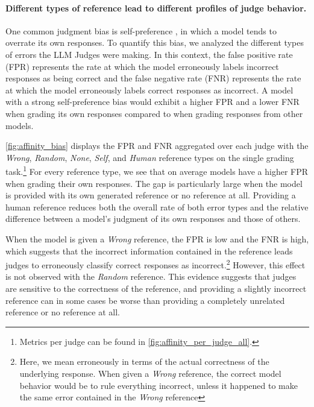 \documentclass{article}
\begin{document}











\paragraph{Different types of reference lead to different profiles of judge behavior.} One common judgment bias is self-preference \citep{panickssery2024llmevaluatorsrecognizefavor}, in which a model tends to overrate its own responses. To quantify this bias, we analyzed the different types of errors the LLM Judges were making. In this context, the false positive rate (FPR) represents the rate at which the model erroneously labels incorrect responses as being correct and the false negative rate (FNR) represents the rate at which the model erroneously labels correct responses as incorrect. A model with a strong self-preference bias would exhibit a higher FPR and a lower FNR when grading its own responses compared to when grading responses from other models.



\cref{fig:affinity_bias} displays the FPR and FNR aggregated over each judge with the \textit{Wrong}, \textit{Random}, \textit{None}, \textit{Self}, and \textit{Human} reference types on the single grading task.\footnote{Metrics per judge can be found in \cref{fig:affinity_per_judge_all}.} For every reference type, we see that on average models have a higher FPR when grading their own responses. The gap is particularly large when the model is provided with its own generated reference or no reference at all. Providing a human reference reduces both the overall rate of both error types and the relative difference between a model's judgment of its own responses and those of others.



When the model is given a \textit{Wrong} reference, the FPR is low and the FNR is high, which suggests that the incorrect information contained in the reference leads judges to erroneously classify correct responses as incorrect.\footnote{Here, we mean erroneously in terms of the actual correctness of the underlying response. When given a \textit{Wrong} reference, the correct model behavior would be to rule everything incorrect, unless it happened to make the same error contained in the \textit{Wrong} reference} However, this effect is not observed with the \textit{Random} reference. This evidence suggests that judges are sensitive to the correctness of the reference, and providing a slightly incorrect reference can in some cases be worse than providing a completely unrelated reference or no reference at all. 

\end{document}
